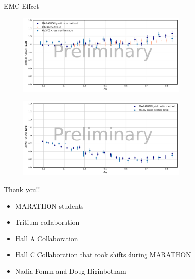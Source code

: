 \documentclass{beamer}
\begin{document}
\begin{frame}{EMC Effect}
\vspace{-20pt}
\begin{figure}
	\includegraphics[width=8.5cm]{../images/He3_EMC.pdf}
\end{figure}
\vspace{-20pt}
\begin{figure}
	\includegraphics[width=8.5cm]{../images/H3_EMC.pdf}
\end{figure}
\end{frame}



\begin{frame}
\begin{block}{Thank you!!}
	\begin{itemize}
		\item MARATHON students
		\item Tritium collaboration
		\item Hall A Collaboration
		\item Hall C Collaboration that took shifts during MARATHON
		\item Nadia Fomin and Doug Higinbotham
	\end{itemize}
\end{block}
\end{frame}
\end{document}
